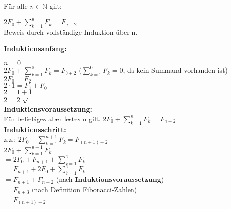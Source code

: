 \documentclass[11pt,a4paper]{article}
\begin{document}
Für alle $ n \in \mathbb{N}$ gilt:

$ 2F_0 + \sum \limits_{k=1}^n F_k = F_{n+2}$ \\

Beweis durch vollständige Induktion über n.

\textbf{Induktionsanfang:}

$ n = 0$ \\
$ 2F_0 + \sum \limits_{k=1}^0 F_k = F_{0+2}$ ($ \sum \limits_{k=1}^0 F_k = 0$, da kein Summand vorhanden ist) \\
$2F_0 = F_2$ \\
$2\cdot1 = F_1 + F_0$\\
$2 = 1 + 1$ \\
$2 = 2$ $\surd$ \\

\textbf{Induktionsvoraussetzung:} \\
Für beliebiges aber festes n gilt:
$ 2F_0 + \sum \limits_{k=1}^n F_k = F_{n+2}$ \\

\textbf{Induktionsschritt:} \\
z.z.: $ 2F_0 + \sum \limits_{k=1}^{n+1} F_k = F_{(n+1)+2}$ \\

$ 2F_0 + \sum \limits_{k=1}^{n+1} F_k$ \\
$= 2F_0 + F_{n+1} + \sum \limits_{k=1}^n F_k$ \\
$= F_{n+1} + 2F_0 + \sum \limits_{k=1}^n F_k$ \\
$= F_{n+1} + F_{n+2}$   (nach \textbf{Induktionsvoraussetzung}) \\
$= F_{n+3}$   (nach Definition Fibonacci-Zahlen) \\
$= F_{(n+1)+2}$    $~~~~ _\Box$
\end{document}
